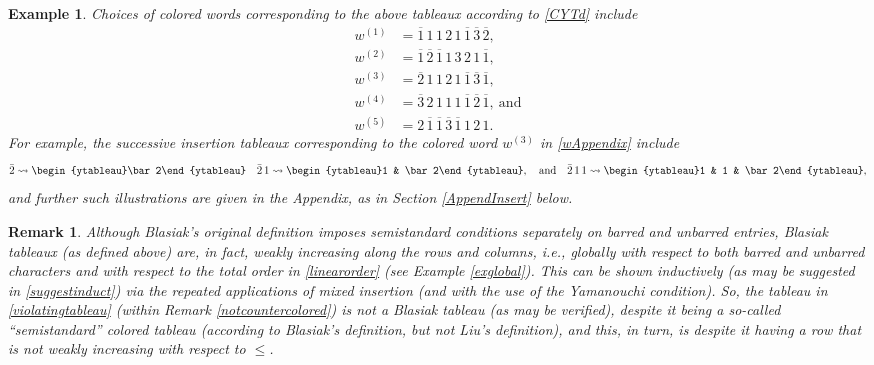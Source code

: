 \documentclass[12pt]{article}
\newtheorem{remark}{Remark}
\newtheorem{example}{Example}
\begin{document}
\begin{example}
\noindent Choices of colored words corresponding to the above tableaux according to \eqref{CYTd} include 
\begin{align}
 w^{(1)} & = \overline{1} \, 1 \, 1 \, 2 \, 1 \, \overline{1} \, \overline{3} \, \overline{2}, \nonumber \\ 
 w^{(2)} & = \overline{1} \, \overline{2} \, \overline{1} \, 1 \, 3 \, 2 \, 1 \, \overline{1}, \nonumber \\ 
 w^{(3)} & = \overline{2} \, 1 \, 1 \, 2 \, 1 \, \overline{1} \, \overline{3} \, \overline{1}, \label{wAppendix} \\ 
 w^{(4)} & = \overline{3} \, 2 \, 1 \, 1 \, 1 \, \overline{1} \, \overline{2} \, \overline{1}, 
 \ \text{and} \nonumber \\ 
 w^{(5)} & = 2 \, \overline{1} \, \overline{1} \, \overline{3} \, \overline{1} \, 1 \, 2 \, 1. 
\end{align}
 For example, the successive insertion tableaux corresponding to the colored word $w^{(3)}$ in \eqref{wAppendix} include 
\begin{equation}\label{suggestinduct}
 \bar2 
 \rightsquigarrow \begin{ytableau}\bar2\end{ytableau} \ \ \ \bar2\,1 \rightsquigarrow \begin{ytableau}1 & \bar2\end{ytableau}, \ \ 
 \ \text{and} \ \ \ \bar2\,1\,1 \rightsquigarrow \begin{ytableau}1 & 1 & \bar2\end{ytableau}, 
\end{equation}
 and further such illustrations are given in the Appendix, as in Section \ref{AppendInsert} below. 
\end{example}

\begin{remark} 
 Although Blasiak’s original definition imposes semistandard conditions \emph{separately} on barred and unbarred entries, Blasiak 
 tableaux (as defined above) are, in fact, weakly increasing along the rows and columns, i.e., globally with respect to both barred and 
 unbarred characters and with respect to the total order in \eqref{linearorder} (see Example \ref{exglobal}). This can be shown inductively 
 (as may be suggested in \eqref{suggestinduct}) via the repeated applications of mixed insertion (and with the use of the 
 Yamanouchi condition). So, the tableau in \eqref{violatingtableau} (within Remark \ref{notcountercolored}) is not a Blasiak tableau (as 
 may be verified), despite it being a so-called ``semistandard'' colored tableau (according to Blasiak's definition, but not Liu's definition), 
 and this, in turn, is despite it having a row that is not weakly increasing with respect to $\leq$.
\end{remark}
\end{document}

